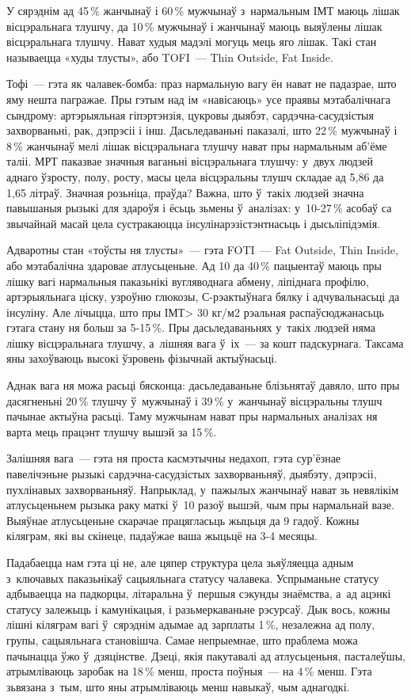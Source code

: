 У сярэднім ад 45\,\% жанчынаў і 60\,\% мужчынаў з~нармальным ІМТ маюць лішак вісцэральнага тлушчу, да 10\,\% мужчынаў і жанчынаў маюць выяўлены лішак вісцэральнага тлушчу. Нават худыя мадэлі могуць мець яго лішак. Такі стан называецца «худы тлусты», або TOFI~--- Thin Outside, Fat Inside.

Тофі~--- гэта як чалавек-бомба: праз нармальную вагу ён нават не падазрае, што яму нешта пагражае. Пры гэтым над ім «навісаюць» усе праявы мэтабалічнага сындрому: артэрыяльная гіпэртэнзія, цукровы дыябэт, сардэчна-сасудзістыя захворваньні, рак, дэпрэсіі і інш. Дасьледаваньні паказалі, што 22\,\% мужчынаў і 8\,\% жанчынаў мелі лішак вісцэральнага тлушчу нават пры нармальным аб'ёме таліі. МРТ паказвае значныя ваганьні вісцэральнага тлушчу: у~двух людзей аднаго ўзросту, полу, росту, масы цела вісцэральны тлушч складае ад 5,86 да 1,65 літраў. Значная розьніца, праўда? Важна, што ў~такіх людзей значна павышаныя рызыкі для здароўя і ёсьць зьмены ў~аналізах: у~10-27\,\% асобаў са звычайнай масай цела сустракаюцца інсулінарэзістэнтнасьць і дысьліпідэмія.

Адваротны стан «тоўсты ня тлусты»~--- гэта FOTI~--- Fat Outside, Thin Inside, або мэтабалічна здаровае атлусьценьне. Ад 10 да 40\,\% пацыентаў маюць пры лішку вагі нармальныя паказьнікі вугляводнага абмену, ліпіднага профілю, артэрыяльнага ціску, узроўню глюкозы, С-рэактыўнага бялку і адчувальнасьці да інсуліну. Але лічыцца, што пры ІМТ> 30 кг/м2 рэальная распаўсюджанасьць гэтага стану ня больш за 5-15\,\%. Пры дасьледаваньнях у~такіх людзей няма лішку вісцэральнага тлушчу, а~лішняя вага ў~іх~--- за кошт падскурнага. Таксама яны захоўваюць высокі ўзровень фізычнай актыўнасьці.

Аднак вага ня можа расьці бясконца: дасьледаваньне блізьнятаў давяло, што пры дасягненьні 20\,\% тлушчу ў~мужчынаў і 39\,\% у~жанчынаў вісцэральны тлушч пачынае актыўна расьці. Таму мужчынам нават пры нармальных аналізах ня варта мець працэнт тлушчу вышэй за 15\,\%.

Залішняя вага~--- гэта ня проста касмэтычны недахоп, гэта сур'ёзнае павелічэньне рызыкі сардэчна-сасудзістых захворваньняў, дыябэту, дэпрэсіі, пухлінавых захворваньняў. Напрыклад, у~пажылых жанчынаў нават зь невялікім атлусьценьнем рызыка раку маткі ў~10 разоў вышэй, чым пры нармальнай вазе. Выяўнае атлусьценьне скарачае працягласьць жыцьця да 9 гадоў. Кожны кіляграм, які вы скінеце, падаўжае ваша жыцьцё на 3-4 месяцы.

Падабаецца нам гэта ці не, але цяпер структура цела зьяўляецца адным з~ключавых паказьнікаў сацыяльнага статусу чалавека. Успрыманьне статусу адбываецца на падкорцы, літаральна ў~першыя сэкунды знаёмства, а~ад ацэнкі статусу залежыць і камунікацыя, і разьмеркаваньне рэсурсаў. Дык вось, кожны лішні кіляграм вагі ў~сярэднім адымае ад зарплаты 1\,\%, незалежна ад полу, групы, сацыяльнага становішча. Самае непрыемнае, што праблема можа пачынацца ўжо ў~дзяцінстве. Дзеці, якія пакутавалі ад атлусьценьня, пасталеўшы, атрымліваюць заробак на 18\,\% менш, проста поўныя~--- на 4\,\% менш. Гэта зьвязана з~тым, што яны атрымліваюць менш навыкаў, чым аднагодкі.

